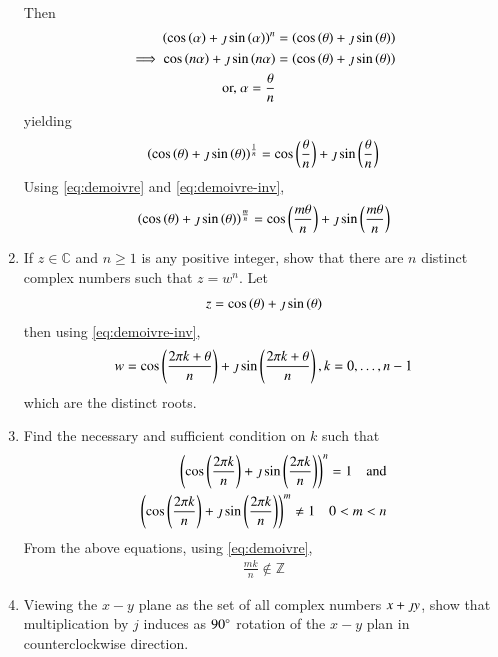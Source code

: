 \begin{enumerate}[label=\arabic*.,ref=\thesubsection.\theenumi]
\begin{align}
		\end{align}
		Then 
		\begin{align}
			\left(	\cos\left(\alpha\right)+\jmath\sin\left(\alpha\right) \right)^{n} &= \left(\cos\left(\theta\right)+\jmath\sin\left(\theta\right)\right)
			\\
			\implies \cos\left(n\alpha\right)+\jmath\sin\left(n\alpha\right)  &= \left(\cos\left(\theta\right)+\jmath\sin\left(\theta\right)\right)
			\\
			\text{or, } \alpha = \frac{\theta}{n}
		\end{align}
		yielding 
		\begin{align}
			\left(\cos\left(\theta\right)+\jmath\sin\left(\theta\right)\right)^{\frac{1}{n}} = \cos\left(\frac{\theta}{n}\right)+\jmath\sin\left(\frac{\theta}{n}\right)
			\label{eq:demoivre-inv}
		\end{align}
			Using \eqref{eq:demoivre} and  
			\eqref{eq:demoivre-inv},
		\begin{align}
\left(\cos\left(\theta\right)+\jmath\sin\left(\theta\right)\right)^{\frac{m}{n}}
= \cos\left(\frac{m\theta}{n}\right)+\jmath\sin\left(\frac{m\theta}{n}\right)
		\end{align}
	\item If $z \in \mathbb{C}$ and $n \ge 1$ is any positive integer, show that there are $n$ distinct complex numbers such that $z = w^n$.
		\solution Let 
		\begin{align}
			z = \cos\left(\theta\right)+\jmath\sin\left(\theta\right)
		\end{align}
		then using 
			\eqref{eq:demoivre-inv},
		\begin{align}
			w = \cos\left(\frac{2\pi k +\theta}{n}\right)+\jmath\sin\left(\frac{2\pi k +\theta}{n}\right), k = 0,\dots,n-1
		\end{align}
		which are the distinct roots.
	\item Find the necessary and sufficient condition on $k$ such that 
		\begin{align}
			\left(\cos\left(\frac{2\pi k }{n}\right)+\jmath\sin\left(\frac{2\pi k }{n}\right)\right)^n = 1 \quad \text{and} 
			\\
			\left(\cos\left(\frac{2\pi k }{n}\right)+\jmath\sin\left(\frac{2\pi k }{n}\right)\right)^m \ne 1 \quad 0 < m < n
		\end{align}
		\solution From the above equations, using 
			\eqref{eq:demoivre}, 
		\begin{align}
			\frac{mk}{n} \notin \mathbb{Z}
		\end{align}
	\item Viewing the $x-y$ plane as the set of all complex numbers $x+\jmath y$, show that multiplication by $j$ induces as $90\degree$ rotation of the $x-y$ plan in counterclockwise direction.

\end{enumerate}
